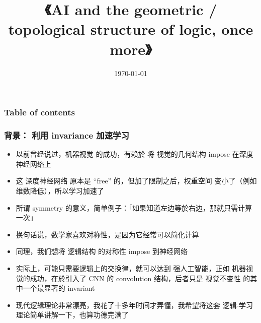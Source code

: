 \documentclass[16pt]{beamer}
\title[Structure of logic once more]{\cc{再谈一次 AI 的逻辑／几何／拓扑结构}
{\Huge《AI and the geometric / topological structure of logic, once more》}}
\author{\cc{YKY 甄景贤}{YKY}} %
\date{\today} %
\makeatletter
\newcommand{\emp}[1]{{\color{violet}#1}}
\newcommand{\smiley}{$\vcenter{\hbox{\texttt{[image: ../smiling-face.png]}}}$}
\newif\ifframeinlbf
\newcommand\listofframes{\@starttoc{lbf}}
\makeatother
\begin{document}
\frameinlbffalse
\addtocounter{page}{-1}
\begin{frame}
\titlepage
\end{frame}

\addtocounter{page}{-1}
\begin{frame}[noframenumbering]
\frametitle{Table of contents}
\listofframes
\end{frame}



\frameinlbftrue

%	

\begin{frame}
\frametitle{背景： 利用 invariance 加速学习}
\begin{itemize}
	\item 以前曾经说过，机器视觉 的成功，有赖於 将 视觉的几何结构 impose 在深度神经网络上
	\item 这 深度神经网络 原本是 ``free'' 的，但加了限制之后，权重空间 变小了（例如维数降低），所以学习加速了
	\item 所谓 symmetry 的意义，简单例子：「如果知道左边等於右边，那就只需计算一次」
	\item 换句话说，数学家喜欢对称性，是因为它经常可以简化计算
	\item 同理，我们想将 逻辑结构 的对称性 impose 到神经网络
	\item 实际上，可能只需要逻辑上的交换律，就可以达到 强人工智能，正如 机器视觉的成功，在於引入了 CNN 的 convolution 结构，后者只是 视觉不变性 的其中一个最显著的 invariant
	\item 现代逻辑理论非常漂亮，我花了十多年时间才弄懂，我希望将这套 逻辑-学习 理论简单讲解一下，也算功德完满了
\end{itemize}
\end{frame}
\end{document}
